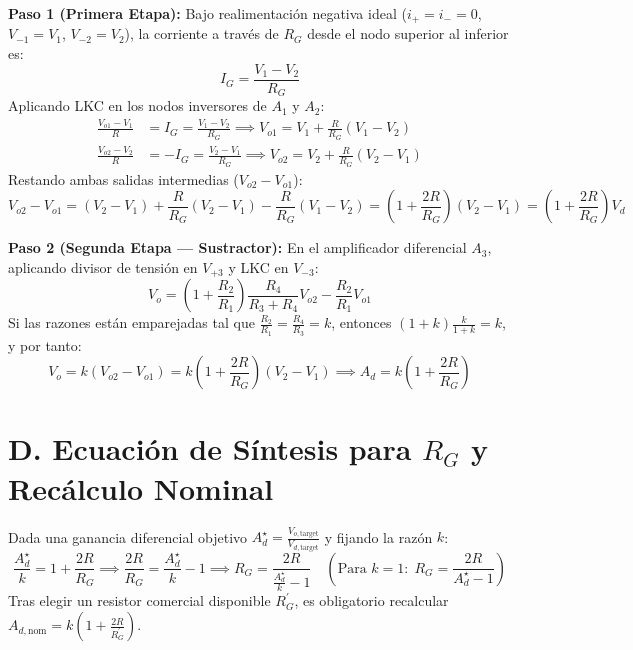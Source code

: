 \documentclass[11pt, a4paper]{article}
\begin{document}
\textbf{Paso 1 (Primera Etapa):} Bajo realimentación negativa ideal ($i_+ = i_- = 0$, $V_{-1} = V_1$, $V_{-2} = V_2$), la corriente a través de $R_G$ desde el nodo superior al inferior es:
\begin{equation}
    I_G = \frac{V_1 - V_2}{R_G}
\end{equation}
Aplicando LKC en los nodos inversores de $A_1$ y $A_2$:
\begin{align}
    \frac{V_{o1} - V_1}{R} &= I_G = \frac{V_1 - V_2}{R_G} \implies V_{o1} = V_1 + \frac{R}{R_G}(V_1 - V_2) \\
    \frac{V_{o2} - V_2}{R} &= -I_G = \frac{V_2 - V_1}{R_G} \implies V_{o2} = V_2 + \frac{R}{R_G}(V_2 - V_1)
\end{align}
Restando ambas salidas intermedias ($V_{o2} - V_{o1}$):
\begin{equation}
    V_{o2} - V_{o1} = (V_2 - V_1) + \frac{R}{R_G}(V_2 - V_1) - \frac{R}{R_G}(V_1 - V_2) = \left(1 + \frac{2R}{R_G}\right)(V_2 - V_1) = \left(1 + \frac{2R}{R_G}\right)V_d
\end{equation}

\textbf{Paso 2 (Segunda Etapa — Sustractor):} En el amplificador diferencial $A_3$, aplicando divisor de tensión en $V_{+3}$ y LKC en $V_{-3}$:
\begin{equation}
    V_o = \left(1 + \frac{R_2}{R_1}\right)\frac{R_4}{R_3 + R_4}V_{o2} - \frac{R_2}{R_1}V_{o1}
\end{equation}
Si las razones están emparejadas tal que $\frac{R_2}{R_1} = \frac{R_4}{R_3} = k$, entonces $\left(1+k\right)\frac{k}{1+k} = k$, y por tanto:
\begin{equation}
    V_o = k(V_{o2} - V_{o1}) = k\left(1 + \frac{2R}{R_G}\right)(V_2 - V_1) \implies \boxed{A_d = k\left(1 + \frac{2R}{R_G}\right)}
\end{equation}

\section*{D. Ecuación de Síntesis para $R_G$ y Recálculo Nominal}
Dada una ganancia diferencial objetivo $A_d^\star = \frac{V_{o,\mathrm{target}}}{V_{d,\mathrm{target}}}$ y fijando la razón $k$:
\begin{equation}
    \frac{A_d^\star}{k} = 1 + \frac{2R}{R_G} \implies \frac{2R}{R_G} = \frac{A_d^\star}{k} - 1 \implies \boxed{R_G = \frac{2R}{\frac{A_d^\star}{k} - 1}} \quad \left(\text{Para } k=1:\; R_G = \frac{2R}{A_d^\star - 1}\right)
\end{equation}
Tras elegir un resistor comercial disponible $R_G^\prime$, es obligatorio recalcular $A_{d,\mathrm{nom}} = k\left(1 + \frac{2R}{R_G^\prime}\right)$.
\end{document}
